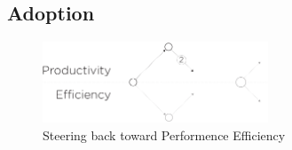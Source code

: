 
\subsection{Adoption} \label{chapter3:software-productivity:adoption}

\begin{figure}[!h]
\begin{center}
\includegraphics[width=0.6\textwidth]{../resources/state-of-the-art-2.pdf}
\end{center}
\caption{Steering back toward Performence Efficiency}
\label{fig:state-of-the-art-2}
\end{figure}


